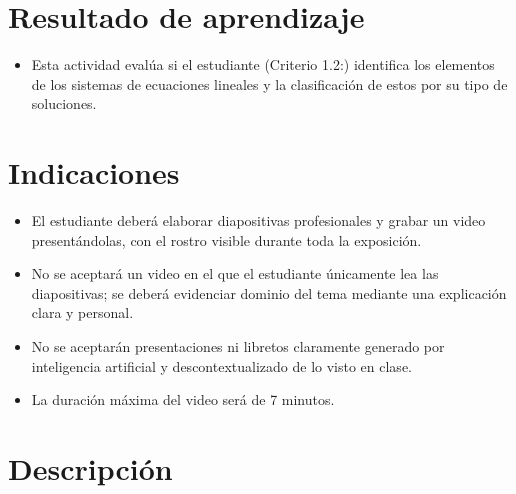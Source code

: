 \documentclass[a4,11pt]{aleph-notas}
\begin{document}
\encabezado


\section{Resultado de aprendizaje}

\begin{itemize}
\item 
    Esta actividad evalúa si el estudiante ({Criterio 1.2:}) identifica los elementos de los sistemas de ecuaciones lineales y la clasificación de estos por su tipo de soluciones.
\end{itemize}

\section{Indicaciones}

\begin{itemize}
\item 
    El estudiante deberá elaborar diapositivas profesionales y grabar un video presentándolas, con el rostro visible durante toda la exposición.
\item 
    No se aceptará un video en el que el estudiante únicamente lea las diapositivas; se deberá evidenciar dominio del tema mediante una explicación clara y personal.
\item 
    No se aceptarán presentaciones ni libretos claramente generado por inteligencia artificial y descontextualizado de lo visto en clase.
\item 
    La duración máxima del video será de 7 minutos.
\end{itemize}


\section{Descripción}
\end{document}
